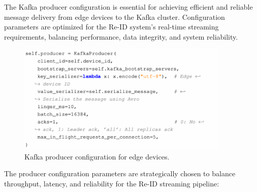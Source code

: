 The Kafka producer configuration is essential for achieving efficient and reliable message delivery from edge devices to the Kafka cluster. Configuration parameters are optimized for the Re-ID system's real-time streaming requirements, balancing performance, data integrity, and system reliability.

\begin{figure}[htbp]
    \centering
    \includegraphics[width=0.9\textwidth]{Figure/producer_conf.png}
    \caption{Kafka producer configuration for edge devices.}
    \label{fig:producer_config}
\end{figure}

The producer configuration parameters are strategically chosen to balance throughput, latency, and reliability for the Re-ID streaming pipeline:


